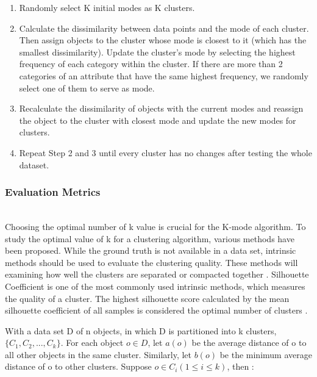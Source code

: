 \documentclass{article}
\makeatletter
\newcommand\subsubsubsection{\@startsection{paragraph}{4}{\z@}{-2.5ex\@plus -1ex \@minus -.25ex}{1.25ex \@plus .25ex}{\normalfont\normalsize\bfseries}}
\makeatother
\begin{document}
\begin{enumerate}
    \item Randomly select K initial modes as K clusters.
    
    \item Calculate the dissimilarity between data points and the mode of each cluster. Then assign objects to the cluster whose mode is closest to it (which has the smallest dissimilarity). Update the cluster’s mode by selecting the highest frequency of each category within the cluster. If there are more than 2 categories of an attribute that have the same highest frequency, we randomly select one of them to serve as mode.
    
    \item Recalculate the dissimilarity of objects with the current modes and reassign the object to the cluster with closest mode and update the new modes for clusters.
    
    \item Repeat Step 2 and 3 until every cluster has no changes after testing the whole dataset.
\end{enumerate}

\subsubsection{Evaluation Metrics}
\subsubsubsection{Silhouette Coefficient}
\\
\noindent Choosing the optimal number of k value is crucial for the 
K-mode algorithm. To study the optimal value of k for a clustering algorithm, 
various methods have been proposed. While the ground truth is not available
in a data set, intrinsic methods should be used to evaluate the 
clustering quality. These methods will examining how well the clusters
are separated or compacted together \citep{2012vi}. Silhouette Coefficient is one of the most
commonly used intrinsic methods, which measures the quality of a cluster. The highest
silhouette score calculated by the mean silhouette coefficient of all samples
is considered the optimal number of clusters \citep{9260048}. 

\noindent With a data set D of n objects, in which D is partitioned into 
k clusters, $\{C_1,C_2,...,C_k\}$. For each object $o \in D$, 
let $a(o)$ be the average distance of o to all other objects in the same cluster.
Similarly, let $b(o)$ be the minimum average distance of o to other clusters.
Suppose $o \in C_i(1 \leq i \leq k )$, then \citep{2012vi}: 
\end{document}
